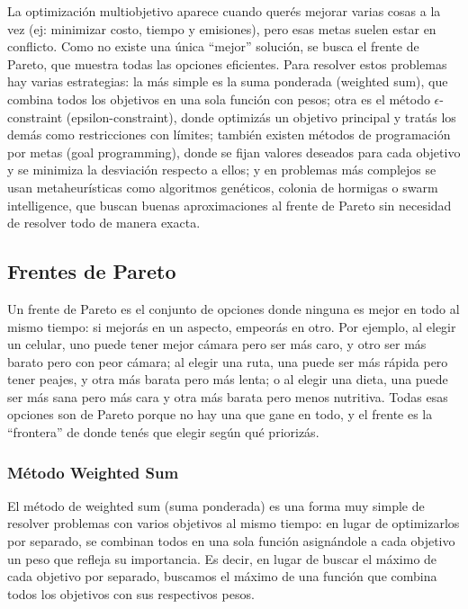 \documentclass[12pt]{article}
\begin{document}
La optimización multiobjetivo aparece cuando querés mejorar varias cosas a la vez (ej: minimizar costo, tiempo y emisiones), pero esas metas suelen estar en conflicto. Como no existe una única “mejor” solución, se busca el frente de Pareto, que muestra todas las opciones eficientes. Para resolver estos problemas hay varias estrategias: la más simple es la suma ponderada (weighted sum), que combina todos los objetivos en una sola función con pesos; otra es el método $\epsilon$-constraint (epsilon-constraint), donde optimizás un objetivo principal y tratás los demás como restricciones con límites; también existen métodos de programación por metas (goal programming), donde se fijan valores deseados para cada objetivo y se minimiza la desviación respecto a ellos; y en problemas más complejos se usan metaheurísticas como algoritmos genéticos, colonia de hormigas o swarm intelligence, que buscan buenas aproximaciones al frente de Pareto sin necesidad de resolver todo de manera exacta.

\subsection{Frentes de Pareto}

Un frente de Pareto es el conjunto de opciones donde ninguna es mejor en todo al mismo tiempo: si mejorás en un aspecto, empeorás en otro. Por ejemplo, al elegir un celular, uno puede tener mejor cámara pero ser más caro, y otro ser más barato pero con peor cámara; al elegir una ruta, una puede ser más rápida pero tener peajes, y otra más barata pero más lenta; o al elegir una dieta, una puede ser más sana pero más cara y otra más barata pero menos nutritiva. Todas esas opciones son de Pareto porque no hay una que gane en todo, y el frente es la “frontera” de donde tenés que elegir según qué priorizás.

\subsubsection{Método Weighted Sum}

El método de weighted sum (suma ponderada) es una forma muy simple de resolver problemas con varios objetivos al mismo tiempo: en lugar de optimizarlos por separado, se combinan todos en una sola función asignándole a cada objetivo un peso que refleja su importancia. Es decir, en lugar de buscar el máximo de cada objetivo por separado, buscamos el máximo de una función que combina todos los objetivos con sus respectivos pesos.
\end{document}
